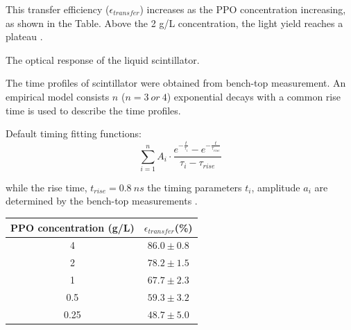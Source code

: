 
This transfer efficiency ($\mathcal{\epsilon}_{transfer}$) increases as the PPO concentration increasing, as shown in the Table. Above the 2 g/L concentration, the light yield reaches a plateau
\cite{collaboration2020development}.


The optical response of the liquid scintillator.

The time profiles of scintillator were obtained from bench-top measurement. 
An empirical model consists $n$ ($n=3~or~4$) exponential decays  with a common rise time is used to describe the time profiles\cite{biller2020slow}.

Default timing fitting functions:
\[\sum^{n}_{i=1}A_i\cdot\frac{e^{-\frac{t}{\tau_i}}-e^{-\frac{t}{\tau_{rise}}}}{\tau_i-\tau_{rise}}
\]

while the rise time, $t_{rise} = 0.8~ns$ the timing parameters $t_i$,
amplitude $a_i$ are determined by the bench-top measurements \cite{chicagoTiming}.




\begin{table}[ht]
	\centering
	\begin{tabular}{cc}
		\toprule
		PPO concentration (g/L) & $\mathcal{\epsilon}_{transfer}$(\%)	\\
		\midrule
		4   & $86.0\pm 0.8$\\
		2  & $78.2\pm 1.5$\\
		1  & $67.7\pm 2.3$\\
		0.5 & $59.3\pm 3.2$\\
		0.25 & $48.7\pm 5.0$\\
		\bottomrule
	\end{tabular}
	\label{transfer_efficiency}
\end{table}


